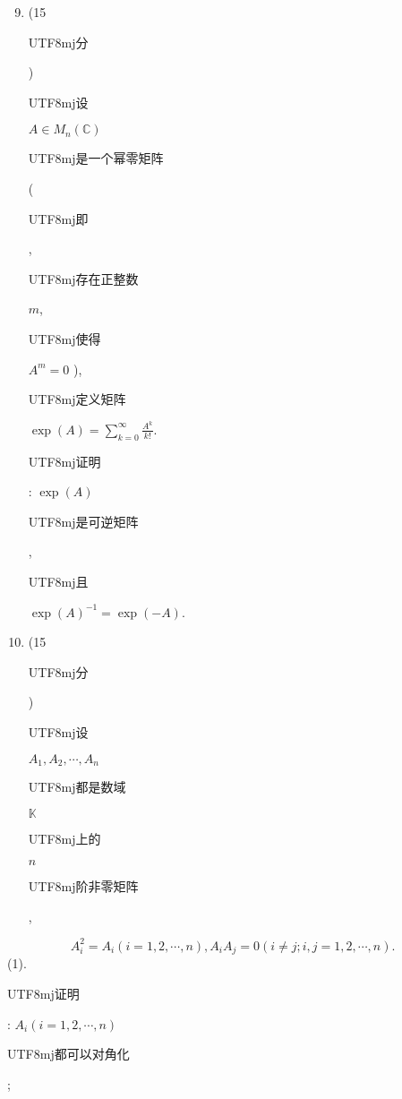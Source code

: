 \documentclass[10pt]{article}
\begin{document}
\begin{enumerate}
  \setcounter{enumi}{8}
  \item (15 \begin{CJK}{UTF8}{mj}分\end{CJK}) \begin{CJK}{UTF8}{mj}设\end{CJK} $A \in M_{n}(\mathbb{C})$ \begin{CJK}{UTF8}{mj}是一个幂零矩阵\end{CJK} (\begin{CJK}{UTF8}{mj}即\end{CJK}, \begin{CJK}{UTF8}{mj}存在正整数\end{CJK} $m$, \begin{CJK}{UTF8}{mj}使得\end{CJK} $A^{m}=0$ ), \begin{CJK}{UTF8}{mj}定义矩阵\end{CJK} $\exp (A)=\sum_{k=0}^{\infty} \frac{A^{k}}{k !}$. \begin{CJK}{UTF8}{mj}证明\end{CJK}: $\exp (A)$ \begin{CJK}{UTF8}{mj}是可逆矩阵\end{CJK}, \begin{CJK}{UTF8}{mj}且\end{CJK} $\exp (A)^{-1}=\exp (-A)$.

  \item (15 \begin{CJK}{UTF8}{mj}分\end{CJK}) \begin{CJK}{UTF8}{mj}设\end{CJK} $A_{1}, A_{2}, \cdots, A_{n}$ \begin{CJK}{UTF8}{mj}都是数域\end{CJK} $\mathbb{K}$ \begin{CJK}{UTF8}{mj}上的\end{CJK} $n$ \begin{CJK}{UTF8}{mj}阶非零矩阵\end{CJK},

\end{enumerate}
$$
A_{i}^{2}=A_{i}(i=1,2, \cdots, n), A_{i} A_{j}=0(i \neq j ; i, j=1,2, \cdots, n) .
$$
(1). \begin{CJK}{UTF8}{mj}证明\end{CJK}: $A_{i}(i=1,2, \cdots, n)$ \begin{CJK}{UTF8}{mj}都可以对角化\end{CJK};
\end{document}
